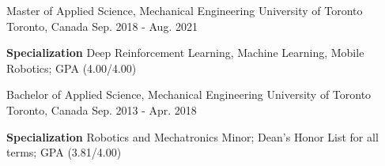 
\begin{cventries}
  \cventry
    {Master of Applied Science, Mechanical Engineering}
    {University of Toronto}
    {Toronto, Canada}
    {Sep. 2018 - Aug. 2021}
    {
      \begin{cvitems}
        \item \textbf{Specialization} Deep Reinforcement Learning, Machine Learning, Mobile Robotics; GPA (4.00/4.00)
      \end{cvitems}
    }
  \cventry
    {Bachelor of Applied Science, Mechanical Engineering}
    {University of Toronto}
    {Toronto, Canada}
    {Sep. 2013 - Apr. 2018}
    {
      \begin{cvitems}
        \item \textbf{Specialization} Robotics and Mechatronics Minor; Dean's Honor List for all terms; GPA (3.81/4.00)
      \end{cvitems}
    }
\end{cventries}
